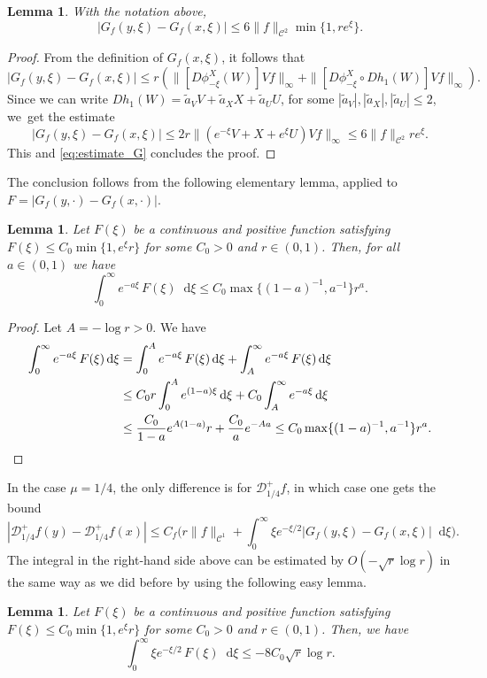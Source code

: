 \documentclass[10pt]{amsart}
\newcommand*{\diff}{\mathop{}\!\mathrm{d}}
\newtheorem {lemma}[theorem]{Lemma}
\theoremstyle{definition}
\begin{document}
\begin{lemma}
With the notation above,
\[
|G_{f}(y,\xi) -G_{f}(x,\xi) |\leq 6 \|f\|_{\mathscr{C}^2} \min\{1, r e^\xi\}.
\]
\end{lemma}
\begin{proof}
From the definition of $G_{f}(x,\xi)$, it follows that
\[
|G_{f}(y,\xi) -G_{f}(x,\xi) |\leq r (\|[D\phi^X_{-\xi}(W) ] Vf \|_\infty + \|[D\phi^X_{-\xi} \circ Dh_1 (W)] Vf \|_\infty).
\]
Since we can write $Dh_1 (W) = {\widetilde a_V}V+{\widetilde a_X}X+{\widetilde a_U}U$, for some $|{\widetilde a_V}|, |{\widetilde a_X}|, |{\widetilde a_U}|\leq 2$, we~get the estimate
\[
|G_{f}(y,\xi) -G_{f}(x,\xi) |\leq 2 r \|(e^{-\xi}V + X + e^{\xi}U)Vf\|_\infty \leq 6 \|f\|_{\mathscr{C}^2} r e^\xi.
\]
This and \eqref{eq:estimate_G} concludes the proof.
\end{proof}

The conclusion follows from the following elementary lemma, applied to $F=|G_{f}(y, \cdot) - G_{f}(x, \cdot)|$.

\begin{lemma}
Let $F(\xi)$ be a continuous and positive function satisfying $F(\xi) \leq C_0 \min\{ 1, e^\xi r\}$ for some $C_0>0$ and $r \in (0,1)$. Then, for all $a\in (0,1)$ we have
\[
\int_0^\infty e^{-a \xi} \, F(\xi) \diff \xi \leq C_0 \max\{(1-a)^{-1}, a^{-1}\} r^a.
\]
\end{lemma}
\begin{proof}
Let $A = -\log r >0$. We have
\begin{align*}
\int_0^\infty e^{-a \xi} \, F(\xi) \diff \xi &= \int_0^A e^{-a \xi} \, F(\xi) \diff \xi + \int_A^{\infty} e^{-a \xi} \, F(\xi) \diff \xi \\
& \leq C_0 r \int_0^A e^{(1-a) \xi} \diff \xi + C_0 \int_A^{\infty} e^{-a \xi} \diff \xi \\
&\leq \frac{C_0}{1-a}e^{A(1-a)} r + \frac{C_0}{a} e^{-Aa} \leq C_0 \max\{(1-a)^{-1}, a^{-1}\} r^a.\qedhere
\end{align*}
\end{proof}

In the case $\mu=1/4$, the only difference is for $\mathcal{D}^{+}_{1/4}f$, in which case one gets the bound
\[
|\mathcal{D}^{+}_{1/4}f(y) - \mathcal{D}^{+}_{1/4}f(x)|\leq C_{f} \biggl(r \|f\|_{\mathscr{C}^1} + \int_0^{\infty} \xi e^{- \xi/2} |G_{f}(y,\xi) -G_{f}(x,\xi) |\diff \xi \biggr).
\]
The integral in the right-hand side above can be estimated by $O(-\sqrt{r} \log r)$ in the same way as we did before by using the following easy lemma.
\begin{lemma}
Let $F(\xi)$ be a continuous and positive function satisfying $F(\xi) \leq C_0 \min\{ 1, e^\xi r\}$ for some $C_0>0$ and $r \in (0,1)$. Then, we have
\[
\int_0^\infty \xi e^{- \xi/2} \, F(\xi) \diff \xi \leq -8C_0 \sqrt{r} \log r.
\]
\end{lemma}
\end{document}
